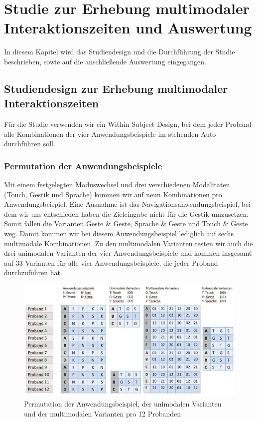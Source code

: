 \chapter[Studie und Auswertung]{Studie zur Erhebung multimodaler Interaktionszeiten und Auswertung}\label{cha:Studie}
In diesem Kapitel wird das Studiendesign und die Durchführung der Studie beschrieben, sowie auf die anschließende Auswertung eingegangen. 
\section[Studiendesign]{Studiendesign zur Erhebung multimodaler Interaktionszeiten}
Für die Studie verwenden wir ein Within Subject Design, bei dem jeder Proband alle Kombinationen der vier Anwendungsbeispiele im stehenden Auto durchführen soll.
\subsection[Permutation]{Permutation der Anwendungsbeispiele}
Mit einem festgelegten Moduswechsel und drei verschiedenen Modalitäten (Touch, Gestik und Sprache) kommen wir auf neun Kombinationen pro Anwendungsbeispiel. 
Eine Ausnahme ist das Navigationsanwendungsbeispiel, bei dem wir uns entschieden haben die Zieleingabe nicht für die Gestik umzusetzen. 
Somit fallen die Varianten Geste \& Geste, Sprache \& Geste und Touch \& Geste weg. 
Damit kommen wir bei diesem Anwendungsbeispiel lediglich auf sechs multimodale Kombinationen. 
Zu den multimodalen Varianten testen wir auch die drei unimodalen Varianten der vier Anwendungsbeispiele und kommen insgesamt auf 33 Varianten für alle vier Anwendungsbeispiele, die jeder Proband durchzuführen hat. 
\begin{figure}[ht]
  \centering
  \includegraphics[width=1\textwidth]{img/Permutation.jpg}
  \caption[Permutation der Anwendungsbeispiel]{Permutation der Anwendungsbeispiel, der unimodalen Varianten und der multimodalen Varianten pro 12 Probanden}
  \label{fig:Permutation}
\end{figure} 

